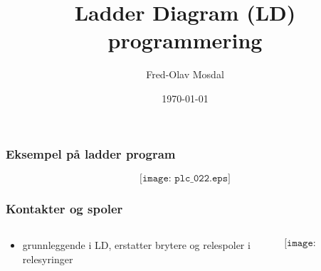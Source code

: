 \documentclass[aspectratio=169,xcolor=dvipsnames]{beamer}
\title[PLS]{Ladder Diagram (LD) programmering} %
\author[Fred-Olav] {Fred-Olav Mosdal}
\institute[Gand VGS] %
{
    Gand VGS \\
    VG3 Automasjon }
\date{\today} %
\begin{document}
\begin{frame}
\titlepage
\end{frame}



\begin{frame}
	\frametitle{Eksempel på ladder program}
	$$\texttt{[image: plc\_022.eps]}$$
\end{frame}

\begin{frame}
	\frametitle{Kontakter og spoler}
	\begin{columns}
		\begin{column}{0.5\textwidth}
	\begin{itemize}
		\item grunnleggende i LD, erstatter brytere og relespoler i relesyringer
	\end{itemize}
		\end{column}
		\begin{column}{0.5\textwidth}
	$$\texttt{[image: plc\_023.eps]}$$
		\end{column}
	\end{columns}
\end{frame}
\end{document}
